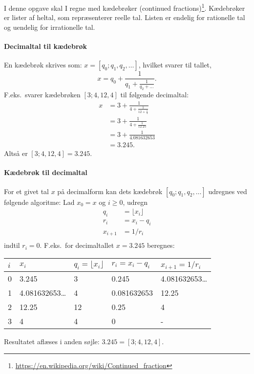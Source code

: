 I denne opgave skal I regne med kædebrøker (continued
fractions)\footnote{\url{https://en.wikipedia.org/wiki/Continued_fraction}}. Kædebrøker
er lister af heltal, som repræsenterer reelle tal. Listen er endelig
for rationelle tal og uendelig for irrationelle tal. 

\paragraph{Decimaltal til kædebrøk}
En kædebrøk skrives som:
$x = [q_0; q_1, q_2, \ldots]$, hvilket svarer til tallet,
\begin{equation}
  x = q_0 + \frac{1}{q_1 + \frac{1}{q_2 + \dots}}.
\end{equation}
F.eks.\ svarer kædebrøken $[3;4, 12, 4]$ til følgende decimaltal:
\begin{align}
  x &= 3 + \frac{1}{4 + \frac{1}{12 + \frac{1}{4}}}
  \\&=  3 + \frac{1}{4 + \frac{1}{12.25}}
  \\&=  3 + \frac{1}{4.081632653}
  \\&=  3.245.
\end{align}
Altså er $[3;4, 12, 4] = 3.245$.

\paragraph{Kædebrøk til decimaltal}
For et givet tal $x$ på decimalform kan dets kædebrøk
$[q_0; q_1, q_2, \ldots]$ udregnes ved følgende algoritme: Lad
$x_0 = x$ og $i \geq 0$, udregn
\begin{align}
q_i &= \lfloor x_i \rfloor\\
r_i &= x_i - q_i\\
x_{i+1} &= 1/r_i\\
\end{align}
indtil $r_i = 0$. F.eks.\ for decimaltallet $x=3.245$ beregnes:
\begin{center}
  \begin{tabular}{|l|l|l|l|l|}
    \hline
    $i$ & $x_i$ & $q_i = \lfloor x_i \rfloor$ & $r_i = x_i - q_i$ & $x_{i+1}=1/r_i$\\
    \hline
    0 & 3.245 & 3 & 0.245 & 4.081632653\ldots\\
    1 & 4.081632653\ldots & 4 & 0.081632653 & 12.25\\
    2 & 12.25 & 12 & 0.25 & 4\\
    3 & 4 & 4 & 0 & -\\
    \hline
  \end{tabular}
\end{center}
Resultatet aflæses i anden søjle: $3.245 = [3; 4, 12, 4]$.

